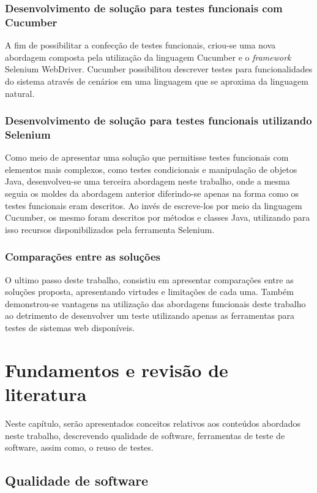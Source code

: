 \documentclass[tg]{mdtufsm}
\begin{document}
\subsection{Desenvolvimento de solução para testes funcionais com Cucumber}
A fim de possibilitar a confecção de testes funcionais, criou-se uma nova abordagem composta pela utilização da linguagem Cucumber e o \emph{framework} Selenium WebDriver.
Cucumber possibilitou descrever testes para funcionalidades do sistema através de cenários em uma linguagem que se aproxima da linguagem natural.

\subsection{Desenvolvimento de solução para testes funcionais utilizando Selenium}
Como meio de apresentar uma solução que permitisse testes funcionais com elementos mais complexos, como testes condicionais e manipulação de objetos Java, desenvolveu-se
uma terceira abordagem neste trabalho, onde a mesma seguia os moldes da abordagem anterior diferindo-se apenas na forma como os testes funcionais eram descritos. Ao invés de
escreve-los por meio da linguagem Cucumber, os mesmo foram descritos por métodos e classes Java, utilizando para isso recursos disponibilizados pela ferramenta Selenium.

\subsection{Comparações entre as soluções}
O ultimo passo deste trabalho, consistiu em apresentar comparações entre as soluções proposta, apresentando virtudes e limitações de cada uma. Também demonstrou-se
vantagens na utilização das abordagens funcionais deste trabalho ao detrimento de desenvolver um teste utilizando apenas as ferramentas para testes de sistemas web disponíveis.

\chapter{Fundamentos e revisão de literatura}

Neste capítulo, serão apresentados conceitos relativos aos conteúdos abordados neste trabalho, descrevendo qualidade de software, ferramentas de teste de software, assim como, o reuso de testes.

\section{Qualidade de software}
\end{document}
